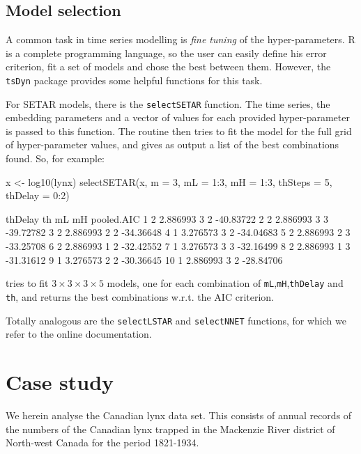 \documentclass[a4paper]{article}
\newcommand{\tsDyn}{\texttt{tsDyn} }
\begin{document}
\subsection{Model selection}
A common task in time series modelling is \emph{fine tuning} of the hyper-parameters. R is a complete programming language, so the user can easily define his error criterion, fit a set of models and chose the best between them. However, the \tsDyn package provides some helpful functions for this task.

For SETAR models, there is the \texttt{selectSETAR} function. The time series, the embedding parameters and a vector of values for each provided hyper-parameter is passed to this function. The routine then tries to fit the model for the full grid of hyper-parameter values, and gives as output a list of the best combinations found. So, for example:
\begin{Schunk}
\begin{Sinput}
 x <- log10(lynx)
 selectSETAR(x, m = 3, mL = 1:3, mH = 1:3, thSteps = 5, thDelay = 0:2)
\end{Sinput}
\begin{Soutput}
   thDelay       th mL mH pooled.AIC
1        2 2.886993  3  2  -40.83722
2        2 2.886993  3  3  -39.72782
3        2 2.886993  2  2  -34.36648
4        1 3.276573  3  2  -34.04683
5        2 2.886993  2  3  -33.25708
6        2 2.886993  1  2  -32.42552
7        1 3.276573  3  3  -32.16499
8        2 2.886993  1  3  -31.31612
9        1 3.276573  2  2  -30.36645
10       1 2.886993  3  2  -28.84706
\end{Soutput}
\end{Schunk}
tries to fit $3 \times 3 \times 3 \times 5$ models, one for each combination of \texttt{mL},\texttt{mH},\texttt{thDelay} and \texttt{th}, and returns the best combinations w.r.t. the AIC criterion.

Totally analogous are the \texttt{selectLSTAR} and \texttt{selectNNET} functions, for which we refer to the online documentation.

\section{Case study}
We herein analyse the Canadian lynx data set.
This consists of annual records of the numbers of the Canadian lynx trapped in the Mackenzie River district of North-west Canada for the period 1821-1934.
\end{document}
